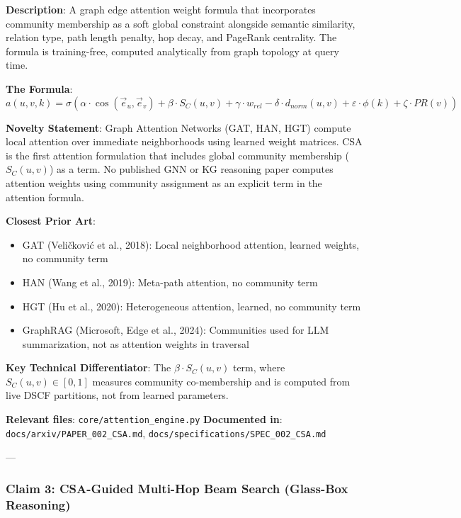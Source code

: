 \documentclass[10pt,journal,compsoc]{IEEEtran}
\begin{document}
\textbf{Description}: A graph edge attention weight formula that incor\-porates community membership as a soft global constraint alongside semantic similarity, relation type, path length penalty, hop decay, and PageRank centrality. The formula is training-free, computed analy\-tically from graph topology at query time.

\textbf{The Formula}:
\begin{equation}
a(u,v,k) = \sigma\left(\alpha \cdot \cos(\vec{e}_u, \vec{e}_v) + \beta \cdot S_C(u,v) + \gamma \cdot w_{rel} - \delta \cdot d_{norm}(u,v) + \varepsilon \cdot \phi(k) + \zeta \cdot PR(v)\right)
\end{equation}

\textbf{Novelty Statement}: Graph Attention Networks (GAT, HAN, HGT) compute local attention over immediate neigh\-borhoods using learned weight matrices. CSA is the first attention formulation that includes global community membership ($S_C(u,v)$) as a term. No published GNN or KG reasoning paper computes attention weights using community assignment as an explicit term in the attention formula.

\textbf{Closest Prior Art}:
\begin{itemize}
\item GAT (Veličković et al., 2018): Local neigh\-borhood attention, learned weights, no community term
\item HAN (Wang et al., 2019): Meta-path attention, no community term
\item HGT (Hu et al., 2020): Hetero\-geneous attention, learned, no community term
\item GraphRAG (Microsoft, Edge et al., 2024): Communities used for LLM summa\-rization, not as attention weights in traversal

\end{itemize}
\textbf{Key Technical Differ\-entiator}: The $\beta \cdot S_C(u,v)$ term, where $S_C(u,v) \in [0,1]$ measures community co-membership and is computed from live DSCF partitions, not from learned parameters.

\textbf{Relevant files}: \texttt{core/attention\_engine.py}
\textbf{Documented in}: \texttt{docs/arxiv/PAPER\_002\_CSA.md}, \texttt{docs/specifications/SPEC\_002\_CSA.md}

---

\subsubsection{Claim 3: CSA-Guided Multi-Hop Beam Search (Glass-Box Reasoning)}
\end{document}
